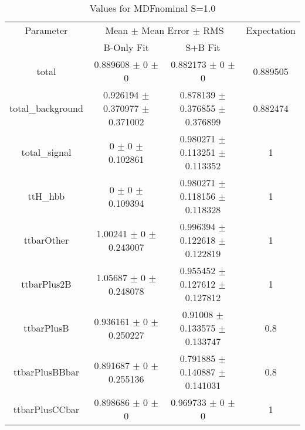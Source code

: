 \begin{table}
\centering
\caption{Values for MDFnominal S=1.0}
\begin{tabular}{cccc}
\toprule
Parameter & \multicolumn{2}{c}{Mean $\pm$ Mean Error $\pm$ RMS} & Expectation\\
 & B-Only Fit & S+B Fit & \\
\midrule
total & \num{0.889608} $\pm$ \num{0} $\pm$ \num{0} & \num{0.882173} $\pm$ \num{0} $\pm$ \num{0} & \num{0.889505}\\
total\_background & \num{0.926194} $\pm$ \num{0.370977} $\pm$ \num{0.371002} & \num{0.878139} $\pm$ \num{0.376855} $\pm$ \num{0.376899} & \num{0.882474}\\
total\_signal & \num{0} $\pm$ \num{0} $\pm$ \num{0.102861} & \num{0.980271} $\pm$ \num{0.113251} $\pm$ \num{0.113352} & \num{1}\\
ttH\_hbb & \num{0} $\pm$ \num{0} $\pm$ \num{0.109394} & \num{0.980271} $\pm$ \num{0.118156} $\pm$ \num{0.118328} & \num{1}\\
ttbarOther & \num{1.00241} $\pm$ \num{0} $\pm$ \num{0.243007} & \num{0.996394} $\pm$ \num{0.122618} $\pm$ \num{0.122819} & \num{1}\\
ttbarPlus2B & \num{1.05687} $\pm$ \num{0} $\pm$ \num{0.248078} & \num{0.955452} $\pm$ \num{0.127612} $\pm$ \num{0.127812} & \num{1}\\
ttbarPlusB & \num{0.936161} $\pm$ \num{0} $\pm$ \num{0.250227} & \num{0.91008} $\pm$ \num{0.133575} $\pm$ \num{0.133747} & \num{0.8}\\
ttbarPlusBBbar & \num{0.891687} $\pm$ \num{0} $\pm$ \num{0.255136} & \num{0.791885} $\pm$ \num{0.140887} $\pm$ \num{0.141031} & \num{0.8}\\
ttbarPlusCCbar & \num{0.898686} $\pm$ \num{0} $\pm$ \num{0} & \num{0.969733} $\pm$ \num{0} $\pm$ \num{0} & \num{1}\\
\bottomrule
\end{tabular}
\end{table}